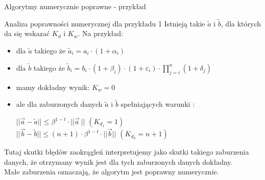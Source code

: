 \begin{frame}[fragile]{Algorytmy numerycznie poprawne - przykład}
	\begin{exampleblock}{Analiza poprawności numerycznej dla przykładu 1}
	  Istnieją takie $\tilde{a}$ i $\tilde{b}$, dla których da się wskazać $K_d$ i $K_w$.
      Na przykład:
        \begin{itemize}
            \item dla $\tilde{a}$ takiego że $\tilde{a}_i= a_i\cdot(1+\alpha_i)$
             \item dla $\tilde{b}$ takiego że $\tilde{b}_i= b_i\cdot(1+\beta_i) \cdot (1 + \varepsilon_i)
                    \cdot \prod_{j=i}^{n} (1 + \delta_j)$
        	\item mamy dokładny wynik: $K_w = 0$
            \item ale dla zaburzonych danych $\tilde{a}$ i $\tilde{b}$ spełniających warunki :
            	\begin{addmargin}[1cm]{0cm}
            		$|| \vec{a} - \tilde{a} || \le \beta^{1-t} \cdot || \vec{a} \ ||$ \hspace{.5cm} $(K_{d_1} = 1)$\\
            		$|| \vec{b} - \tilde{b} || \le (n + 1) \cdot \beta^{1-t} \cdot || \vec{b} ||$ \hspace{.5cm} $(K_{d_2} = n+1)$
            	\end{addmargin}
        \end{itemize}
        Tutaj skutki błędów zaokrągleń  interpretujemy jako skutki takiego zaburzenia danych, że otrzymany wynik jest dla tych zaburzonych danych dokładny.\\
        Małe zaburzenia oznaczają, że algorytm jest poprawny numerycznie.
	\end{exampleblock}
\end{frame}


